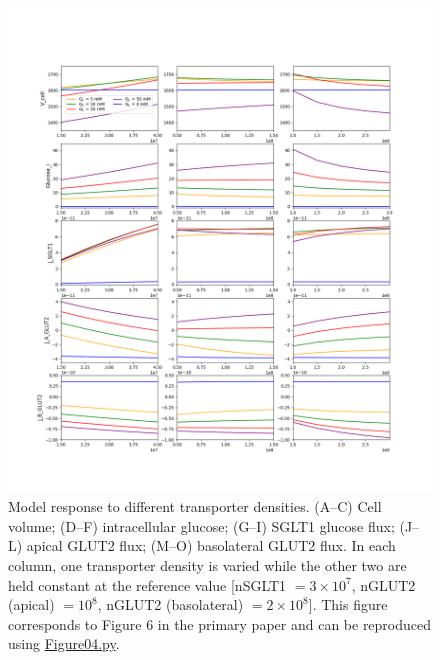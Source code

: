 \documentclass[fleqn,10pt]{physiome}
\begin{document}
\begin{figure}[htb]
\centering
\includegraphics[width=1\linewidth]{Figure04}
\caption{Model response to different transporter densities. (A–C) Cell volume; (D–F) intracellular glucose; (G–I) SGLT1 glucose flux; (J–L) apical GLUT2 flux; (M–O) basolateral GLUT2 flux. In each column, one transporter density is varied while the other two are held constant at the reference value [nSGLT1 $= 3\times10^7$, nGLUT2 (apical) $= 10^8$, nGLUT2 (basolateral) $= 2\times10^8$]. This figure corresponds to Figure 6 in the primary paper and can be reproduced using \href{https://models.physiomeproject.org/workspace/840/rawfile/bc7a5ac43ddbd15d234e66d8cb17df8388d80064/Figure04.py}{Figure04.py}.}
\label{Figure4}
\end{figure}
\end{document}
